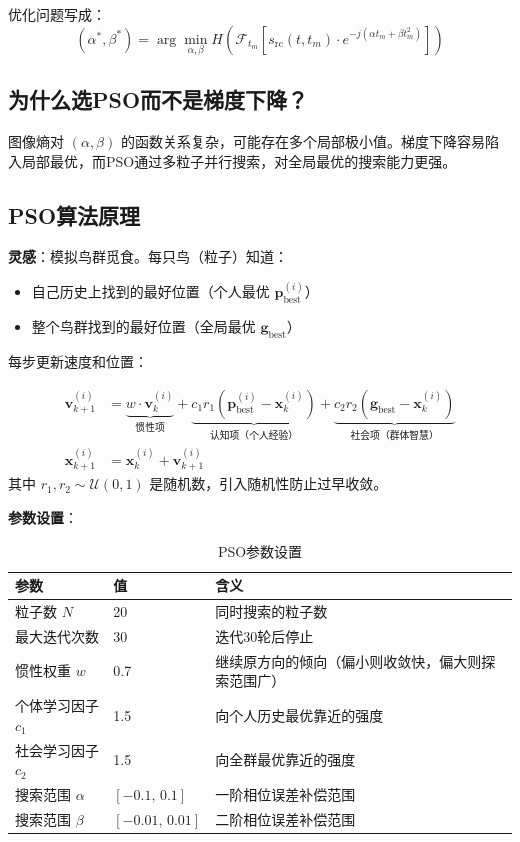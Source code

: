 \documentclass[12pt, a4paper]{article}
\newcommand{\mat}[1]{\boldsymbol{#1}}
\begin{document}
优化问题写成：
\begin{equation}
(\alpha^*, \beta^*) = \arg\min_{\alpha,\beta} H\!\left(\mathcal{F}_{t_m}\!\left[s_\text{rc}(t, t_m) \cdot e^{-j(\alpha t_m + \beta t_m^2)}\right]\right)
\end{equation}

\subsection{为什么选PSO而不是梯度下降？}

图像熵对 $(\alpha, \beta)$ 的函数关系复杂，可能存在多个局部极小值。梯度下降容易陷入局部最优，而PSO通过多粒子并行搜索，对全局最优的搜索能力更强。

\subsection{PSO算法原理}

\textbf{灵感}：模拟鸟群觅食。每只鸟（粒子）知道：
\begin{itemize}
  \item 自己历史上找到的最好位置（个人最优 $\mat{p}_\text{best}^{(i)}$）
  \item 整个鸟群找到的最好位置（全局最优 $\mat{g}_\text{best}$）
\end{itemize}
每步更新速度和位置：

\begin{keybox}[PSO核心迭代公式]
\begin{align}
\mat{v}^{(i)}_{k+1} &= \underbrace{w \cdot \mat{v}^{(i)}_k}_{\text{惯性项}} + \underbrace{c_1 r_1 \left(\mat{p}_\text{best}^{(i)} - \mat{x}^{(i)}_k\right)}_{\text{认知项（个人经验）}} + \underbrace{c_2 r_2 \left(\mat{g}_\text{best} - \mat{x}^{(i)}_k\right)}_{\text{社会项（群体智慧）}} \\[6pt]
\mat{x}^{(i)}_{k+1} &= \mat{x}^{(i)}_k + \mat{v}^{(i)}_{k+1}
\end{align}
其中 $r_1, r_2 \sim \mathcal{U}(0,1)$ 是随机数，引入随机性防止过早收敛。
\end{keybox}

\textbf{参数设置}：
\begin{table}[H]
\centering
\begin{tabular}{lll}
\toprule
参数 & 值 & 含义 \\
\midrule
粒子数 $N$ & 20 & 同时搜索的粒子数 \\
最大迭代次数 & 30 & 迭代30轮后停止 \\
惯性权重 $w$ & 0.7 & 继续原方向的倾向（偏小则收敛快，偏大则探索范围广）\\
个体学习因子 $c_1$ & 1.5 & 向个人历史最优靠近的强度 \\
社会学习因子 $c_2$ & 1.5 & 向全群最优靠近的强度 \\
搜索范围 $\alpha$ & $[-0.1,\,0.1]$ & 一阶相位误差补偿范围 \\
搜索范围 $\beta$ & $[-0.01,\,0.01]$ & 二阶相位误差补偿范围 \\
\bottomrule
\end{tabular}
\caption{PSO参数设置}
\end{table}
\end{document}
